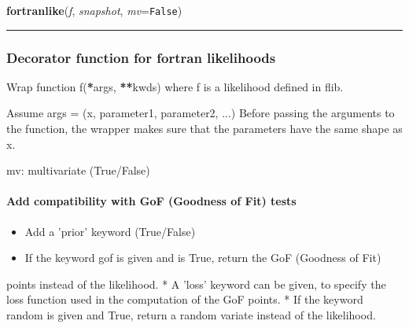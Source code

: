     \vspace{0.5ex}

    \begin{boxedminipage}{\textwidth}

    \raggedright \textbf{fortranlike}(\textit{f}, \textit{snapshot}, \textit{mv}=\texttt{False})

    \vspace{-1.5ex}

    \rule{\textwidth}{0.5\fboxrule}



\hypertarget{decorator-function-for-fortran-likelihoods}{}
\subsubsection*{Decorator function for fortran likelihoods}
\label{decorator-function-for-fortran-likelihoods}

Wrap function f({\color{red}\bfseries{}*}args, {\color{red}\bfseries{}**}kwds) where f is a likelihood defined in flib.

Assume args = (x, parameter1, parameter2, ...)
Before passing the arguments to the function, the wrapper makes sure that
the parameters have the same shape as x.

mv: multivariate (True/False)



\hypertarget{add-compatibility-with-gof-goodness-of-fit-tests}{}
\paragraph*{Add compatibility with GoF (Goodness of Fit) tests}
\label{add-compatibility-with-gof-goodness-of-fit-tests}
\begin{itemize}
\item {} 
Add a 'prior' keyword (True/False)

\item {} 
If the keyword gof is given and is True, return the GoF (Goodness of Fit)

\end{itemize}

points instead of the likelihood.
* A 'loss' keyword can be given, to specify the loss function used in the
computation of the GoF points.
* If the keyword random is given and True, return a random variate instead
of the likelihood.
    \vspace{1ex}

    \end{boxedminipage}

